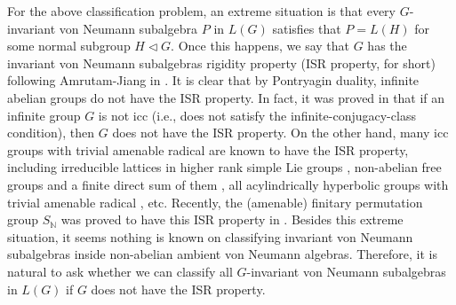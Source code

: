 \documentclass[12pt]{amsart}
\theoremstyle{definition}
\theoremstyle{remark}
\begin{document}
For the above classification problem, an extreme situation is that every $G$-invariant von Neumann subalgebra $P$ in $L(G)$ satisfies that $P=L(H)$ for some normal subgroup $H\lhd G$. Once this happens, we say that $G$ has the invariant von Neumann subalgebras rigidity property (ISR property, for short) following Amrutam-Jiang in \cite{aj}. It is clear that by Pontryagin duality, infinite abelian groups do not have the ISR property. In fact, it was proved in \cite[Proposition 3.1]{aj} that if an infinite group $G$ is not icc (i.e., does not satisfy the infinite-conjugacy-class condition), then $G$ does not have the ISR property. On the other hand, many icc groups with trivial amenable radical are known to have the ISR property, including irreducible lattices in higher rank simple Lie groups \cite{kp}, 
 non-abelian free groups and a finite direct sum of them \cite{aj}, all acylindrically hyperbolic groups with trivial amenable radical  \cite{cds}, etc.  Recently, the (amenable) finitary permutation group
 $S_{\mathbb{N}}$ was proved to have this ISR property in \cite{jz}. Besides this extreme situation, it seems nothing is known on classifying invariant von Neumann subalgebras inside non-abelian ambient von Neumann algebras. Therefore,
it is natural to ask whether we can classify all $G$-invariant von Neumann subalgebras in $L(G)$ if $G$ does not have the ISR property.
\end{document}
